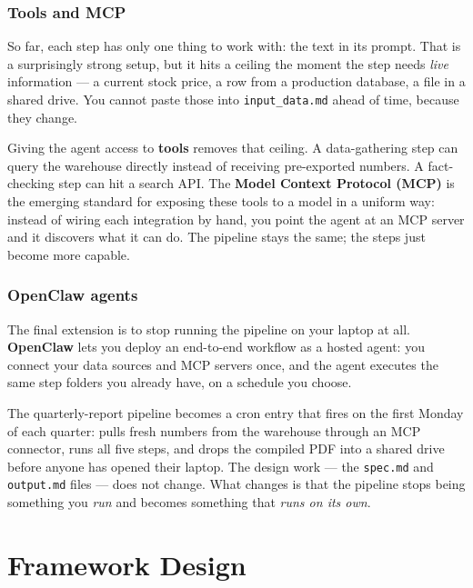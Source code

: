 \documentclass[12pt, a4paper]{article}
\begin{document}
\subsubsection{Tools and MCP}

So far, each step has only one thing to work with: the text in its prompt. That is a surprisingly strong setup, but it hits a ceiling the moment the step needs \textit{live} information --- a current stock price, a row from a production database, a file in a shared drive. You cannot paste those into \texttt{input\_data.md} ahead of time, because they change.

Giving the agent access to \textbf{tools} removes that ceiling. A data-gathering step can query the warehouse directly instead of receiving pre-exported numbers. A fact-checking step can hit a search API. The \textbf{Model Context Protocol (MCP)} is the emerging standard for exposing these tools to a model in a uniform way: instead of wiring each integration by hand, you point the agent at an MCP server and it discovers what it can do. The pipeline stays the same; the steps just become more capable.

\subsubsection{OpenClaw agents}

The final extension is to stop running the pipeline on your laptop at all. \textbf{OpenClaw} lets you deploy an end-to-end workflow as a hosted agent: you connect your data sources and MCP servers once, and the agent executes the same step folders you already have, on a schedule you choose.

The quarterly-report pipeline becomes a cron entry that fires on the first Monday of each quarter: pulls fresh numbers from the warehouse through an MCP connector, runs all five steps, and drops the compiled PDF into a shared drive before anyone has opened their laptop. The design work --- the \texttt{spec.md} and \texttt{output.md} files --- does not change. What changes is that the pipeline stops being something you \textit{run} and becomes something that \textit{runs on its own}.

\clearpage
\section{Framework Design}
\end{document}
